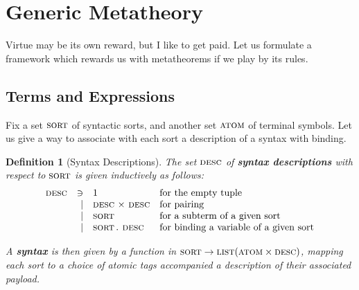 \documentclass[format=acmsmall, screen, review, anonymous, timestamp]{acmart}
\newtheorem{defn}[thm]{Definition}
\begin{document}
\section{Generic Metatheory}

Virtue may be its own reward, but I like to get paid. Let us formulate a framework which rewards us with metatheorems if we play by its rules.

\subsection{Terms and Expressions}

Fix a set $\textsc{sort}$ of syntactic sorts, and another set $\textsc{atom}$ of terminal symbols.
Let us give a way to associate with each sort a description of a syntax with binding.

\newcommand{\dx}{\mathop{\,\red{\times}\,}}
\newcommand{\db}{\mathop{\red{.}\:}}

\begin{defn}[Syntax Descriptions]
  The set $\textsc{desc}$ of \textbf{syntax descriptions} with respect to $\textsc{sort}$ is given inductively as follows:
  \[\begin{array}{rrll}
      \syso{desc} & \ni & \red{1} & \mbox{for the empty tuple} \\
                  & | & \syso{desc} \dx \syso{desc} & \mbox{for pairing} \\
                  & | & \syso{sort} & \mbox{for a subterm of a given sort} \\
                  & | & \syso{sort}\db\syso{desc} & \mbox{for binding a variable of a given sort} \\
    \end{array}\]

  A \textbf{syntax} is then given by a function in $\textsc{sort} \to \textsc{list}(\textsc{atom} \times \textsc{desc})$, mapping each sort to
  a choice of atomic tags accompanied a description of their associated payload.
\end{defn}
\end{document}
